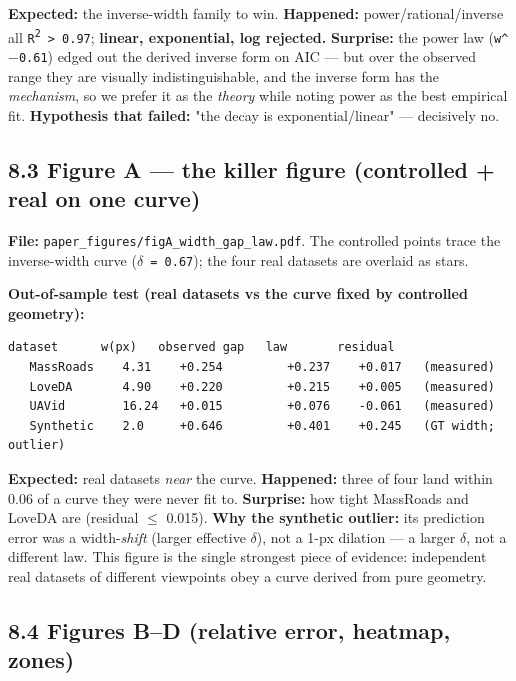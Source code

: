 \documentclass[11pt]{article}
\begin{document}
\textbf{Expected:} the inverse-width family to win. \textbf{Happened:} power/rational/inverse all \texttt{R\textsuperscript{2} > 0.97}; \textbf{linear, exponential, log rejected.} \textbf{Surprise:} the power law (\texttt{w\textasciicircum{}$-$0.61}) edged out the derived inverse form on AIC --- but over the observed range they are visually indistinguishable, and the inverse form has the \textit{mechanism}, so we prefer it as the \textit{theory} while noting power as the best empirical fit. \textbf{Hypothesis that failed:} "the decay is exponential/linear" --- decisively no.

\subsection*{8.3 Figure A --- the killer figure (controlled + real on one curve)}

\textbf{File:} \texttt{paper\_figures/figA\_width\_gap\_law.pdf}. The controlled points trace the inverse-width curve (\texttt{$\delta$ = 0.67}); the four real datasets are overlaid as stars.

\textbf{Out-of-sample test (real datasets vs the curve fixed by controlled geometry):}
\begin{Verbatim}[breaklines=true,breakanywhere=true,fontsize=\footnotesize]
   dataset      w(px)   observed gap   law       residual
   MassRoads    4.31    +0.254         +0.237    +0.017   (measured)
   LoveDA       4.90    +0.220         +0.215    +0.005   (measured)
   UAVid        16.24   +0.015         +0.076    -0.061   (measured)
   Synthetic    2.0     +0.646         +0.401    +0.245   (GT width; outlier)
\end{Verbatim}

\textbf{Expected:} real datasets \textit{near} the curve. \textbf{Happened:} three of four land within 0.06 of a curve they were never fit to. \textbf{Surprise:} how tight MassRoads and LoveDA are (residual $\leq$ 0.015). \textbf{Why the synthetic outlier:} its prediction error was a width-\textit{shift} (larger effective \texttt{$\delta$}), not a 1-px dilation --- a larger \texttt{$\delta$}, not a different law. This figure is the single strongest piece of evidence: independent real datasets of different viewpoints obey a curve derived from pure geometry.

\subsection*{8.4 Figures B--D (relative error, heatmap, zones)}
\end{document}

